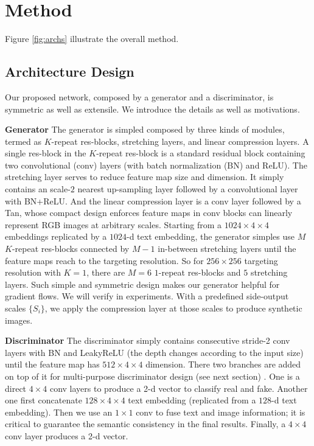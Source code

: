 \documentclass[10pt,twocolumn,letterpaper]{article}
\begin{document}
%
%
%
\begin{figure}[t]
	\centering
	\caption{} \label{fig:archs-compare}
\end{figure}

\section{Method}
Figure \ref{fig:archs} illustrate the overall method.

\subsection{Architecture Design}
Our proposed network, composed by a generator and a discriminator, is symmetric as well as extensile. We introduce the details as well as motivations.

\textbf{Generator} The generator is simpled composed by three kinds of modules, termed as $K$-repeat res-blocks, stretching layers, and linear compression layers.
A single res-block in the $K$-repeat res-block is a standard residual block  \cite{he2016identity} containing two convolutional (conv) layers (with batch normalization (BN) \cite{ioffe2015batch} and ReLU). The stretching layer serves to reduce feature map size and dimension. It simply contains an scale-$2$ nearest up-sampling layer followed by a convolutional layer with BN+ReLU. And the linear compression layer is a conv layer followed by a Tan, whose compact design enforces feature maps in conv blocks can linearly represent RGB images at arbitrary scales.
Starting from a $1024{\times}4{\times}4$ embeddings replicated by a $1024$-d text embedding, the generator simples use $M$ $K$-repeat res-blocks connected by $M{-}1$ in-between stretching layers until the feature maps reach to the targeting resolution. So for $256{\times}256$ targeting resolution with $K{=}1$, there are $M{=}6$ $1$-repeat res-blocks and $5$ stretching layers. Such simple and symmetric design makes our generator helpful for gradient flows. We will verify in experiments. 
With a predefined side-output scales $\{S_i\}$, we apply the compression layer at those scales to produce synthetic images.

\textbf{Discriminator} The discriminator simply contains consecutive stride-2 conv layers with BN and LeakyReLU \cite{} (the depth changes according to the input size) until the feature map has $512{\times}4{\times}4$ dimension. There two branches are added on top of it for multi-purpose discriminator design (see next section) . One is a direct $4{\times}4$ conv layers to produce a 2-d vector to classify real and fake. Another one first concatenate $128{\times}4{\times}4$ text embedding (replicated from a $128$-d text embedding). Then we use an $1{\times}1$ conv to fuse text and image information; it is critical to guarantee the semantic consistency in the final results. Finally, a $4{\times}4$ conv layer produces a 2-d vector.
\end{document}
